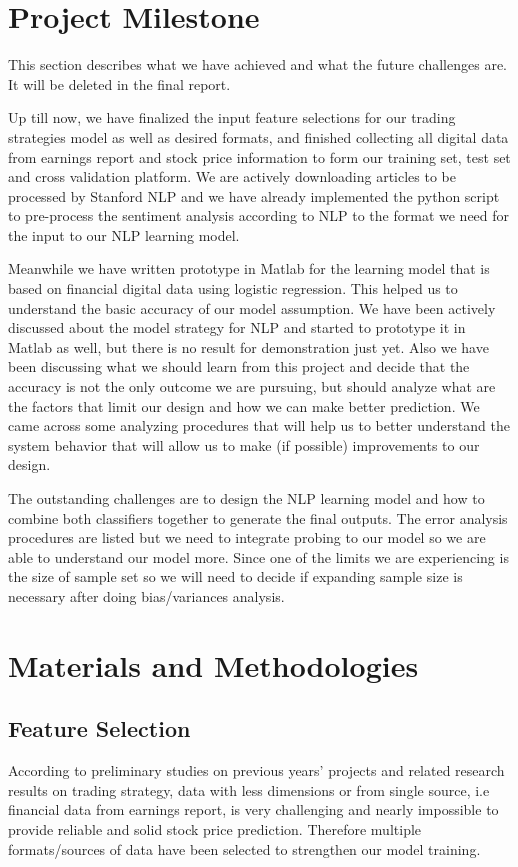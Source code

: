 \documentclass[letterpaper, 10 pt, conference]{ieeeconf}  %
\begin{document}
\section{Project Milestone}

This section describes what we have achieved and what the future challenges are. It will be deleted in the final report.

Up till now, we have finalized the input feature selections for our trading strategies model as well as desired formats, and finished collecting all digital data from earnings report and stock price information to form our training set, test set and cross validation platform. We are actively downloading articles to be processed by Stanford NLP and we have already implemented the python script to pre-process the sentiment analysis according to NLP to the format we need for the input to our NLP learning model.  

Meanwhile we have written prototype in Matlab for the learning model that is based on financial digital data using logistic regression. This helped us to understand the basic accuracy of our model assumption. We have been actively discussed about the model strategy for NLP and started to prototype it in Matlab as well, but there is no result for demonstration just yet. Also we have been discussing what we should learn from this project and decide that the accuracy is not the only outcome we are pursuing, but should analyze what are the factors that limit our design and how we can make better prediction.  We came across some analyzing procedures that will help us to better understand the system behavior that will allow us to make (if possible) improvements to our design.

The outstanding challenges are to design the NLP learning model and how to combine both classifiers together to generate the final outputs. The error analysis procedures are listed but we need to integrate probing to our model so we are able to understand our model more. Since one of the limits we are experiencing is the size of sample set so we will need to decide if expanding sample size is necessary after doing bias/variances analysis.

\section{Materials and Methodologies}

\subsection{Feature Selection}
According to preliminary studies on previous years’ projects and related research results on trading strategy, data with less dimensions or from single source, i.e financial data from earnings report, is very challenging and nearly impossible to provide reliable and solid stock price prediction. Therefore multiple formats/sources of data have been selected to strengthen our model training.
\end{document}
